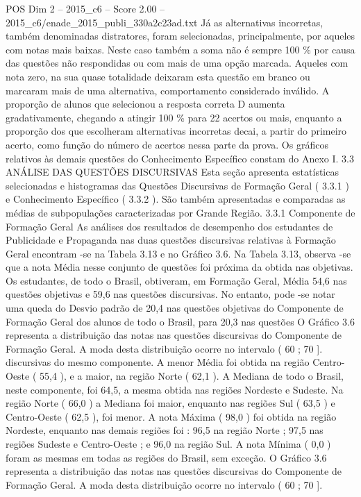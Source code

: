\begin{textsample}{POS Dim 2 – 2015\_c6 – Score 2.00 – 2015\_c6/enade\_2015\_publi\_330a2c23ad.txt}
Já as alternativas incorretas, também denominadas distratores, foram selecionadas, principalmente, por aqueles com notas mais baixas.
Neste caso também a soma não é sempre 100 \% por causa das questões não respondidas ou com mais de uma opção marcada.
Aqueles com nota zero, na sua quase totalidade deixaram esta questão em branco ou marcaram mais de uma alternativa, comportamento considerado inválido.
A proporção de alunos que selecionou a resposta correta D aumenta gradativamente, chegando a atingir 100 \% para 22 acertos ou mais, enquanto a proporção dos que escolheram alternativas incorretas decai, a partir do primeiro acerto, como função do número de acertos nessa parte da prova.
Os gráficos relativos às demais questões do Conhecimento Específico constam do Anexo I. 3.3 ANÁLISE DAS QUESTÕES DISCURSIVAS Esta seção apresenta estatísticas selecionadas e histogramas das Questões Discursivas de Formação Geral ( 3.3.1 ) e Conhecimento Específico ( 3.3.2 ).
São também apresentadas e comparadas as médias de subpopulações caracterizadas por Grande Região. 3.3.1 Componente de Formação Geral As análises dos resultados de desempenho dos estudantes de Publicidade e Propaganda nas duas questões discursivas relativas à Formação Geral encontram -se na Tabela 3.13 e no Gráfico 3.6.
Na Tabela 3.13, observa -se que a nota Média nesse conjunto de questões foi próxima da obtida nas objetivas.
Os estudantes, de todo o Brasil, obtiveram, em Formação Geral, Média 54,6 nas questões objetivas e 59,6 nas questões discursivas.
No entanto, pode -se notar uma queda do Desvio padrão de 20,4 nas questões objetivas do Componente de Formação Geral dos alunos de todo o Brasil, para 20,3 nas questões O Gráfico 3.6 representa a distribuição das notas nas questões discursivas do Componente de Formação Geral.
A moda desta distribuição ocorre no intervalo ( 60 ; 70 ]. discursivas do mesmo componente.
A menor Média foi obtida na região Centro-Oeste ( 55,4 ), e a maior, na região Norte ( 62,1 ).
A Mediana de todo o Brasil, neste componente, foi 64,5, a mesma obtida nas regiões Nordeste e Sudeste.
Na região Norte ( 66,0 ) a Mediana foi maior, enquanto nas regiões Sul ( 63,5 ) e Centro-Oeste ( 62,5 ), foi menor.
A nota Máxima ( 98,0 ) foi obtida na região Nordeste, enquanto nas demais regiões foi : 96,5 na região Norte ; 97,5 nas regiões Sudeste e Centro-Oeste ; e 96,0 na região Sul.
A nota Mínima ( 0,0 ) foram as mesmas em todas as regiões do Brasil, sem exceção.
O Gráfico 3.6 representa a distribuição das notas nas questões discursivas do Componente de Formação Geral.
A moda desta distribuição ocorre no intervalo ( 60 ; 70 ].

\end{textsample}
